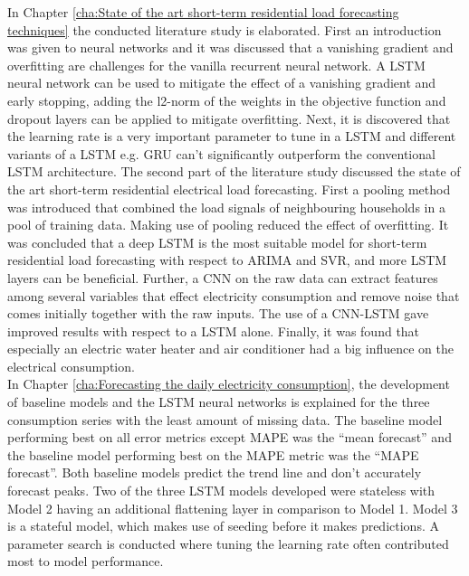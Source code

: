 In Chapter \ref{cha:State of the art short-term residential load forecasting techniques} the conducted literature study is elaborated. First an introduction was given to neural networks and it was discussed that a vanishing gradient and overfitting are challenges for the vanilla recurrent neural network. A LSTM neural network can be used to mitigate the effect of a vanishing gradient and early stopping, adding the l2-norm of the weights in the objective function and dropout layers can be applied to mitigate overfitting. Next, it is discovered that the learning rate is a very important parameter to tune in a LSTM and different variants of a LSTM e.g. GRU can't significantly outperform the conventional LSTM architecture. The second part of the literature study discussed the state of the art short-term residential electrical load forecasting. First a pooling method was introduced that combined the load signals of neighbouring households in a pool of training data. Making use of pooling reduced the effect of overfitting. It was concluded that a deep LSTM is the most suitable model for short-term residential load forecasting with respect to ARIMA and SVR, and more LSTM layers can be beneficial. Further, a CNN on the raw data can extract features among several variables that effect electricity consumption and remove noise that comes initially together with the raw inputs. The use of a CNN-LSTM gave improved results with respect to a LSTM alone. Finally, it was found that especially an electric water heater and air conditioner had a big influence on the electrical consumption.\\

In Chapter \ref{cha:Forecasting the daily electricity consumption}, the development of baseline models and the LSTM neural networks is explained for the three consumption series with the least amount of missing data. The baseline model performing best on all error metrics except MAPE was the ``mean forecast'' and the baseline model performing best on the MAPE metric was the ``MAPE forecast''. Both baseline models predict the trend line and don't accurately forecast peaks. Two of the three LSTM models developed were stateless with Model 2 having an additional flattening layer in comparison to Model 1. Model 3 is a stateful model, which makes use of seeding before it makes predictions. A parameter search is conducted where tuning the learning rate often contributed most to model performance.\\

